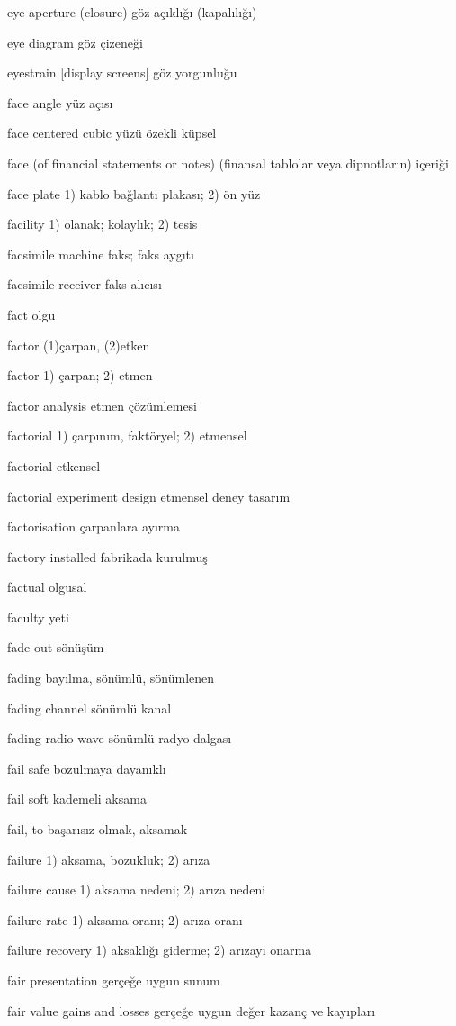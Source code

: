 \documentclass[12pt,fleqn]{article}\usepackage{../../common}
\begin{document}
eye aperture (closure) göz açıklığı (kapalılığı)

eye diagram göz çizeneği

eyestrain [display screens] göz yorgunluğu

face angle yüz açısı

face centered cubic yüzü özekli küpsel

face (of financial statements or notes) (finansal tablolar veya dipnotların) içeriği

face plate 1) kablo bağlantı plakası; 2) ön yüz

facility 1) olanak; kolaylık; 2) tesis

facsimile machine faks; faks aygıtı

facsimile receiver faks alıcısı

fact olgu

factor (1)çarpan, (2)etken

factor 1) çarpan; 2) etmen

factor analysis etmen çözümlemesi

factorial 1) çarpınım, faktöryel; 2) etmensel

factorial etkensel

factorial experiment design etmensel deney tasarım

factorisation çarpanlara ayırma

factory installed fabrikada kurulmuş

factual olgusal

faculty yeti

fade-out sönüşüm

fading bayılma, sönümlü, sönümlenen

fading channel sönümlü kanal

fading radio wave sönümlü radyo dalgası

fail safe bozulmaya dayanıklı

fail soft kademeli aksama

fail, to başarısız olmak, aksamak

failure 1) aksama, bozukluk; 2) arıza

failure cause 1) aksama nedeni; 2) arıza nedeni

failure rate 1) aksama oranı; 2) arıza oranı

failure recovery 1) aksaklığı giderme; 2) arızayı onarma

fair presentation gerçeğe uygun sunum

fair value gains and losses gerçeğe uygun değer kazanç ve kayıpları
\end{document}

